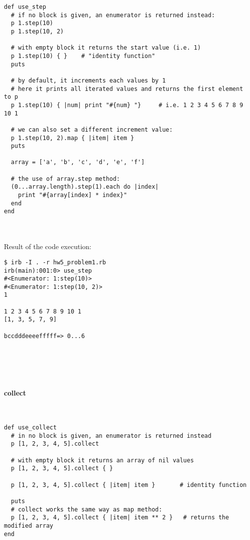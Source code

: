 \documentclass{article}
\begin{document}
\begin{verbatim}
def use_step
  # if no block is given, an enumerator is returned instead:
  p 1.step(10)
  p 1.step(10, 2)

  # with empty block it returns the start value (i.e. 1)
  p 1.step(10) { }    # "identity function"
  puts

  # by default, it increments each values by 1
  # here it prints all iterated values and returns the first element to p
  p 1.step(10) { |num| print "#{num} "}     # i.e. 1 2 3 4 5 6 7 8 9 10 1

  # we can also set a different increment value:
  p 1.step(10, 2).map { |item| item }
  puts

  array = ['a', 'b', 'c', 'd', 'e', 'f']

  # the use of array.step method:
  (0...array.length).step(1).each do |index|
    print "#{array[index] * index}"
  end
end
\end{verbatim}


\paragraph{}\

Result of the code execution:

\begin{verbatim} 
$ irb -I . -r hw5_problem1.rb
irb(main):001:0> use_step
#<Enumerator: 1:step(10)>
#<Enumerator: 1:step(10, 2)>
1

1 2 3 4 5 6 7 8 9 10 1
[1, 3, 5, 7, 9]

bccdddeeeefffff=> 0...6
\end{verbatim}

\paragraph{}\
\paragraph{}\





\paragraph{ collect}\

\begin{verbatim}
def use_collect
  # in no block is given, an enumerator is returned instead
  p [1, 2, 3, 4, 5].collect

  # with empty block it returns an array of nil values
  p [1, 2, 3, 4, 5].collect { }

  p [1, 2, 3, 4, 5].collect { |item| item }       # identity function

  puts
  # collect works the same way as map method:
  p [1, 2, 3, 4, 5].collect { |item| item ** 2 }   # returns the modified array
end
\end{verbatim}
\end{document}
